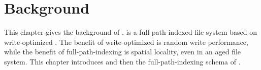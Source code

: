 \chapter{Background}
\label{chap:bg}

This chapter gives the background of \betrfs.
\betrfs is a full-path-indexed file system based on write-optimized \bets.
The benefit of write-optimized \bets is random write performance,
while the benefit of full-path-indexing is spatial locality, even in an aged
file system.
This chapter introduces \bets and then the full-path-indexing schema of \betrfs.

\section{\bets}
\label{sec:bet}
